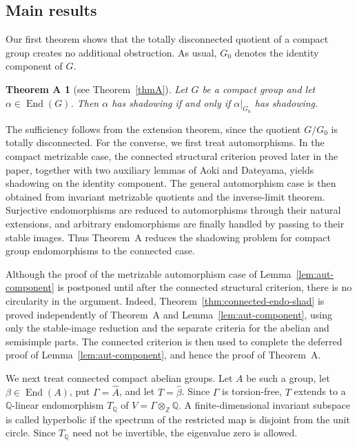 \documentclass[12pt]{amsart}
\newtheorem*{theoremA}{Theorem A}
\theoremstyle{definition}
\numberwithin{equation}{section}
\theoremstyle{remark}
\def\End{\operatorname{End}}
\begin{document}
\subsection{Main results}

Our first theorem shows that the totally disconnected quotient of a compact
group creates no additional obstruction. As usual, \(G_0\) denotes the
identity component of \(G\).

\begin{theoremA}[see Theorem~\ref{thmA}]
Let \(G\) be a compact group and let \(\alpha\in\End(G)\). Then
\(\alpha\) has shadowing if and only if \(\alpha|_{G_0}\) has
shadowing.
\end{theoremA}

The sufficiency follows from the extension theorem, since the quotient
\(G/G_0\) is totally disconnected. For the converse, we first treat
automorphisms. In the compact metrizable case, the connected structural
criterion proved later in the paper, together with two auxiliary lemmas of
Aoki and Dateyama, yields shadowing on the identity component. The general
automorphism case is then obtained from invariant metrizable quotients and the
inverse-limit theorem. Surjective endomorphisms are reduced to automorphisms
through their natural extensions, and arbitrary endomorphisms are finally
handled by passing to their stable images. Thus Theorem~A reduces the
shadowing problem for compact group endomorphisms to the connected case.

Although the proof of the metrizable automorphism case of
Lemma~\ref{lem:aut-component} is postponed until after the connected
structural criterion, there is no circularity in the argument. Indeed,
Theorem~\ref{thm:connected-endo-shad} is proved independently of
Theorem~A and Lemma~\ref{lem:aut-component}, using only the stable-image
reduction and the separate criteria for the abelian and semisimple parts.
The connected criterion is then used to complete the deferred proof of
Lemma~\ref{lem:aut-component}, and hence the proof of Theorem~A.


We next treat connected compact abelian groups. Let \(A\) be such a group,
let \(\beta\in\End(A)\), put \(\Gamma=\widehat A\), and let
\(T=\widehat\beta\). Since \(\Gamma\) is torsion-free, \(T\) extends to a
\(\mathbb Q\)-linear endomorphism \(T_{\mathbb Q}\) of
\(V=\Gamma\otimes_{\mathbb Z}\mathbb Q\). A finite-dimensional invariant
subspace is called hyperbolic if the spectrum of the restricted map is
disjoint from the unit circle. Since \(T_{\mathbb Q}\) need not be invertible,
the eigenvalue zero is allowed.
\end{document}
